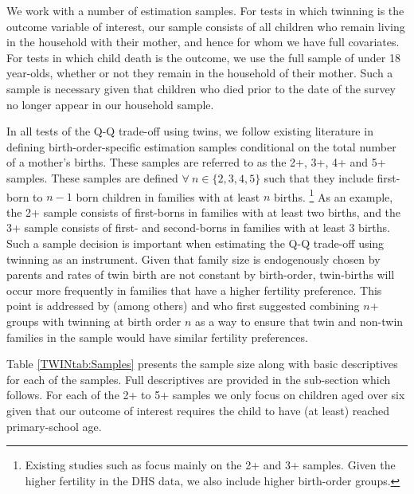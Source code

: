 We work with a number of estimation samples.  For tests in which twinning is the 
outcome variable of interest, our sample consists of all children who remain 
living in the household with their mother, and hence for whom we have full 
covariates.  For tests in which child death is the outcome, we use the full 
sample of under 18 year-olds, whether or not they remain in the household of 
their mother.  Such a sample is necessary given that children who died prior to 
the date of the survey no longer appear in our household sample.

In all tests of the Q-Q trade-off using twins, we follow existing literature in 
defining birth-order-specific estimation samples conditional on the total number 
of a mother's births. These samples are referred to as the 2+, 3+, 4+ and 5+ 
samples.  These samples are defined $\forall\ n \in \{2,3,4,5\}$ such that they 
include first-born to $n-1$ born children in families with at least $n$ births.%
\footnote{Existing studies such as \citet{Angristetal2010} focus mainly on the 2+ 
and 3+ samples.  Given the higher fertility in the DHS data, we also include 
higher birth-order groups.}  As an example, the 2+ sample consists of first-borns 
in families with at least two births, and the 3+ sample consists of first- and 
second-borns in families with at least 3 births.  Such a sample decision is 
important when estimating the Q-Q trade-off using twinning as an instrument.  
Given that family size is endogenously chosen by parents and rates of twin birth
are not constant by birth-order, twin-births will occur more frequently in 
families that have a higher fertility preference. This point is addressed by 
(among others) \citet{RosenzweigWolpin1980} and \citet{Blacketal2005} who first 
suggested combining $n$+ groups with twinning at birth order $n$ as a way to 
ensure that twin and non-twin families in the sample would have similar fertility 
preferences.

Table \ref{TWINtab:Samples} presents the sample size along with basic descriptives 
for each of the samples.  Full descriptives are provided in the sub-section which 
follows. For each of the 2+ to 5+ samples we only focus on children aged over six 
given that our outcome of interest requires the child to have (at least) reached
primary-school age.

